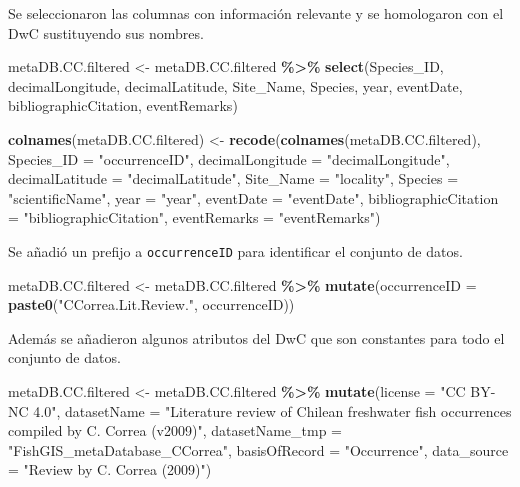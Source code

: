 \documentclass[sn-apa,pdflatex]{sn-jnl}
\newenvironment{Shaded}{\begin{snugshade}}{\end{snugshade}}
\newcommand{\AttributeTok}[1]{\textcolor[rgb]{0.13,0.29,0.53}{#1}}
\newcommand{\FunctionTok}[1]{\textcolor[rgb]{0.13,0.29,0.53}{\textbf{#1}}}
\newcommand{\NormalTok}[1]{#1}
\newcommand{\OtherTok}[1]{\textcolor[rgb]{0.56,0.35,0.01}{#1}}
\newcommand{\SpecialCharTok}[1]{\textcolor[rgb]{0.81,0.36,0.00}{\textbf{#1}}}
\newcommand{\StringTok}[1]{\textcolor[rgb]{0.31,0.60,0.02}{#1}}
\begin{document}
Se seleccionaron las columnas con información relevante y se homologaron
con el DwC sustituyendo sus nombres.

\begin{Shaded}
\begin{Highlighting}[]
\NormalTok{metaDB.CC.filtered }\OtherTok{\textless{}{-}}\NormalTok{ metaDB.CC.filtered }\SpecialCharTok{\%\textgreater{}\%}
    \FunctionTok{select}\NormalTok{(Species\_ID, decimalLongitude, decimalLatitude, Site\_Name,}
\NormalTok{        Species, year, eventDate, bibliographicCitation, eventRemarks)}

\FunctionTok{colnames}\NormalTok{(metaDB.CC.filtered) }\OtherTok{\textless{}{-}} \FunctionTok{recode}\NormalTok{(}\FunctionTok{colnames}\NormalTok{(metaDB.CC.filtered),}
    \AttributeTok{Species\_ID =} \StringTok{"occurrenceID"}\NormalTok{, }\AttributeTok{decimalLongitude =} \StringTok{"decimalLongitude"}\NormalTok{,}
    \AttributeTok{decimalLatitude =} \StringTok{"decimalLatitude"}\NormalTok{, }\AttributeTok{Site\_Name =} \StringTok{"locality"}\NormalTok{,}
    \AttributeTok{Species =} \StringTok{"scientificName"}\NormalTok{, }\AttributeTok{year =} \StringTok{"year"}\NormalTok{, }\AttributeTok{eventDate =} \StringTok{"eventDate"}\NormalTok{,}
    \AttributeTok{bibliographicCitation =} \StringTok{"bibliographicCitation"}\NormalTok{, }\AttributeTok{eventRemarks =} \StringTok{"eventRemarks"}\NormalTok{)}
\end{Highlighting}
\end{Shaded}

Se añadió un prefijo a \texttt{occurrenceID} para identificar el
conjunto de datos.

\begin{Shaded}
\begin{Highlighting}[]
\NormalTok{metaDB.CC.filtered }\OtherTok{\textless{}{-}}\NormalTok{ metaDB.CC.filtered }\SpecialCharTok{\%\textgreater{}\%}
    \FunctionTok{mutate}\NormalTok{(}\AttributeTok{occurrenceID =} \FunctionTok{paste0}\NormalTok{(}\StringTok{"CCorrea.Lit.Review."}\NormalTok{, occurrenceID))}
\end{Highlighting}
\end{Shaded}

Además se añadieron algunos atributos del DwC que son constantes para
todo el conjunto de datos.

\begin{Shaded}
\begin{Highlighting}[]
\NormalTok{metaDB.CC.filtered }\OtherTok{\textless{}{-}}\NormalTok{ metaDB.CC.filtered }\SpecialCharTok{\%\textgreater{}\%}
    \FunctionTok{mutate}\NormalTok{(}\AttributeTok{license =} \StringTok{"CC BY{-}NC 4.0"}\NormalTok{, }\AttributeTok{datasetName =} \StringTok{"Literature review of Chilean freshwater fish occurrences compiled by C. Correa (v2009)"}\NormalTok{,}
        \AttributeTok{datasetName\_tmp =} \StringTok{"FishGIS\_metaDatabase\_CCorrea"}\NormalTok{, }\AttributeTok{basisOfRecord =} \StringTok{"Occurrence"}\NormalTok{,}
        \AttributeTok{data\_source =} \StringTok{"Review by C. Correa (2009)"}\NormalTok{)}
\end{Highlighting}
\end{Shaded}
\end{document}
